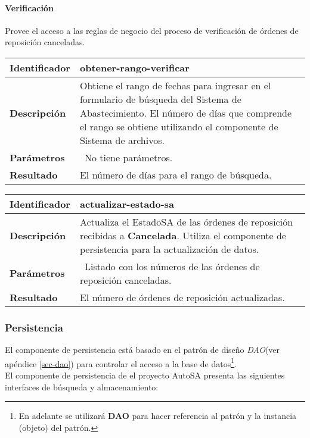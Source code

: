 \paragraph{Verificación\\}
Provee el acceso a las reglas de negocio del proceso de verificación de órdenes de reposición canceladas.

	\begin{longtable}{|p{}|p{}|}
		\hline
		\textbf{Identificador}	& \textbf{obtener-rango-verificar}\\
		\hline
		\hline
		\textbf{Descripción}	& Obtiene el rango de fechas para ingresar en el formulario de búsqueda del Sistema de Abastecimiento. El número de días que comprende el rango se obtiene utilizando el componente de Sistema de archivos.\\
		\hline
		\textbf{Parámetros}		& \textbullet\, No tiene parámetros.\\
		\hline
		\textbf{Resultado}		& El número de días para el rango de búsqueda.\\
		\hline
	\end{longtable}

	\begin{longtable}{|p{}|p{}|}
		\hline
		\textbf{Identificador}	& \textbf{actualizar-estado-sa}\\
		\hline
		\hline
		\textbf{Descripción}	& Actualiza el EstadoSA de las órdenes de reposición recibidas a \textbf{Cancelada}. Utiliza el componente de persistencia para la actualización de datos.\\
		\hline
		\textbf{Parámetros}		& \textbullet\, Listado con los números de las órdenes de reposición canceladas.\\
		\hline
		\textbf{Resultado}		& El número de órdenes de reposición actualizadas.\\
		\hline
	\end{longtable}

\subsubsection{Persistencia}
El componente de persistencia está basado en el patrón de diseño \textit{DAO}(ver apéndice \ref{sec-dao}) para controlar el acceso a la base de datos\footnote{En adelante se utilizará \textbf{DAO} para hacer referencia al patrón y la instancia (objeto) del patrón.}.\\
El componente de persistencia de el proyecto AutoSA presenta las siguientes interfaces de búsqueda y almacenamiento:
